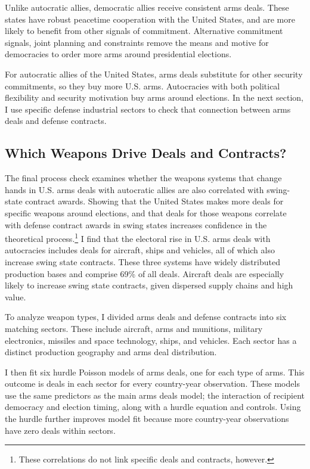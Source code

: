 \documentclass[12pt]{article}
\begin{document}
Unlike autocratic allies, democratic allies receive consistent arms deals. 
These states have robust peacetime cooperation with the United States, and are more likely to benefit from other signals of commitment.
Alternative commitment signals, joint planning and constraints remove the means and motive for democracies to order more arms around presidential elections.


For autocratic allies of the United States, arms deals substitute for other security commitments, so they buy more U.S. arms. 
Autocracies with both political flexibility and security motivation buy arms around elections. 
In the next section, I use specific defense industrial sectors to check that connection between arms deals and defense contracts. 



\subsection{Which Weapons Drive Deals and Contracts?} 


The final process check examines whether the weapons systems that change hands in U.S. arms deals with autocratic allies are also correlated with swing-state contract awards. 
Showing that the United States makes more deals for specific weapons around elections, and that deals for those weapons correlate with defense contract awards in swing states increases confidence in the theoretical process.\footnote{These correlations do not link specific deals and contracts, however.}
I find that the electoral rise in U.S. arms deals with autocracies includes deals for aircraft, ships and vehicles, all of which also increase swing state contracts. 
These three systems have widely distributed production bases and comprise 69\% of all deals. 
Aircraft deals are especially likely to increase swing state contracts, given dispersed supply chains and high value. 


To analyze weapon types, I divided arms deals and defense contracts into six matching sectors. 
These include aircraft, arms and munitions, military electronics, missiles and space technology, ships, and vehicles.  
Each sector has a distinct production geography and arms deal distribution.


I then fit six hurdle Poisson models of arms deals, one for each type of arms. 
This outcome is deals in each sector for every country-year observation. 
These models use the same predictors as the main arms deals model; the interaction of recipient democracy and election timing, along with a hurdle equation and controls.
Using the hurdle further improves model fit because more country-year observations have zero deals within sectors. 
\end{document}
